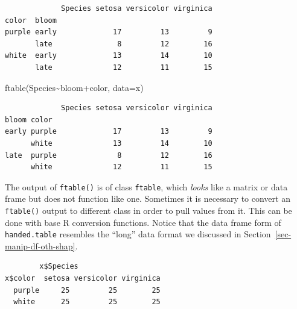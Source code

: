 \documentclass[
  13,
  letterpaper,
]{report}
\newenvironment{Shaded}{\begin{snugshade}}{\end{snugshade}}
\newcommand{\AttributeTok}[1]{\textcolor[rgb]{0.40,0.45,0.13}{#1}}
\newcommand{\FunctionTok}[1]{\textcolor[rgb]{0.28,0.35,0.67}{#1}}
\newcommand{\NormalTok}[1]{\textcolor[rgb]{0.00,0.23,0.31}{#1}}
\newcommand{\OtherTok}[1]{\textcolor[rgb]{0.00,0.23,0.31}{#1}}
\newcommand{\SpecialCharTok}[1]{\textcolor[rgb]{0.37,0.37,0.37}{#1}}
\begin{document}
\begin{verbatim}
             Species setosa versicolor virginica
color  bloom                                    
purple early             17         13         9
       late               8         12        16
white  early             13         14        10
       late              12         11        15
\end{verbatim}

\begin{Shaded}
\begin{Highlighting}[]
\FunctionTok{ftable}\NormalTok{(Species}\SpecialCharTok{\textasciitilde{}}\NormalTok{bloom}\SpecialCharTok{+}\NormalTok{color, }\AttributeTok{data=}\NormalTok{x)}
\end{Highlighting}
\end{Shaded}

\begin{verbatim}
             Species setosa versicolor virginica
bloom color                                     
early purple             17         13         9
      white              13         14        10
late  purple              8         12        16
      white              12         11        15
\end{verbatim}

The output of \texttt{ftable()} is of class \texttt{ftable}, which
\emph{looks} like a matrix or data frame but does not function like one.
Sometimes it is necessary to convert an \texttt{ftable()} output to
different class in order to pull values from it. This can be done with
base R conversion functions. Notice that the data frame form of
\texttt{handed.table} resembles the ``long'' data format we discussed in
Section~\ref{sec-manip-df-oth-shap}.

\begin{Shaded}
\end{Shaded}

\begin{verbatim}
        x$Species
x$color  setosa versicolor virginica
  purple     25         25        25
  white      25         25        25
\end{verbatim}
\end{document}
